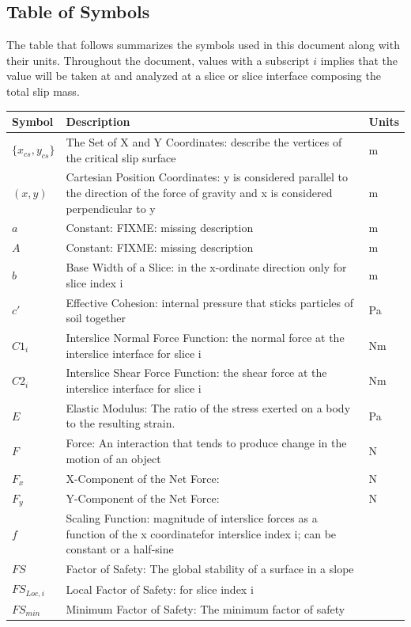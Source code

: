 \documentclass[12pt]{article}
\begin{document}
\subsection{Table of Symbols}
\label{Sec:ToS}
The table that follows summarizes the symbols used in this document along with their units. Throughout the document, values with a subscript $i$ implies that the value will be taken at and analyzed at a slice or slice interface composing the total slip mass.
\begin{longtabu}{l X[l] l}
\toprule
Symbol & Description & Units
\\
\midrule
$\{{x_{cs}}{,y_{cs}}\}$ & The Set of X and Y Coordinates: describe the vertices of the critical slip surface & m
\\
$(x,y)$ & Cartesian Position Coordinates: y is considered parallel to the direction of the force of gravity and x is considered perpendicular to y & m
\\
$a$ & Constant: FIXME: missing description & m
\\
$A$ & Constant: FIXME: missing description & m
\\
$b$ & Base Width of a Slice: in the x-ordinate direction only for slice index i & m
\\
$c'$ & Effective Cohesion: internal pressure that sticks particles of soil together & Pa
\\
${C1_{i}}$ & Interslice Normal Force Function: the normal force at the interslice interface for slice i & Nm
\\
${C2_{i}}$ & Interslice Shear Force Function: the shear force at the interslice interface for slice i & Nm
\\
$E$ & Elastic Modulus: The ratio of the stress exerted on a body to the resulting strain. & Pa
\\
$F$ & Force: An interaction that tends to produce change in the motion of an object & N
\\
${F_{x}}$ & X-Component of the Net Force:  & N
\\
${F_{y}}$ & Y-Component of the Net Force:  & N
\\
$f$ & Scaling Function: magnitude of interslice forces as a function of the x coordinatefor interslice index i; can be constant or a half-sine & 
\\
$FS$ & Factor of Safety: The global stability of a surface in a slope & 
\\
${FS_{Loc,i}}$ & Local Factor of Safety: for slice index i & 
\\
${FS_{min}}$ & Minimum Factor of Safety: The minimum factor of safety & 

\end{longtabu}
\end{document}

